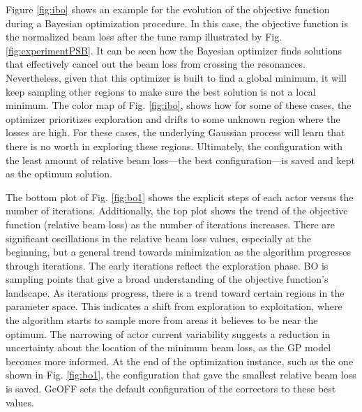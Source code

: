 Figure \ref{fig:ibo} shows an example for the evolution of the objective function during a Bayesian optimization procedure. In this case, the objective function is the normalized beam loss after the tune ramp illustrated by Fig. \ref{fig:experimentPSB}. It can be seen how the Bayesian optimizer finds solutions that effectively cancel out the beam loss from crossing the resonances. Nevertheless, given that this optimizer is built to find a global minimum, it will keep sampling other regions to make sure the best solution is not a local minimum. The color map of Fig. \ref{fig:ibo}, shows how for some of these cases, the optimizer prioritizes exploration and drifts to some unknown region where the losses are high. For these cases, the underlying Gaussian process will learn that there is no worth in exploring these regions. Ultimately, the configuration with the least amount of relative beam loss---the best configuration---is saved and kept as the optimum solution.

The bottom plot of Fig. \ref{fig:bo1} shows the explicit steps of each actor versus the number of iterations. Additionally, the top plot shows the trend of the objective function (relative beam loss) as the number of iterations increases. There are significant oscillations in the relative beam loss values, especially at the beginning, but a general trend towards minimization as the algorithm progresses through iterations. The early iterations reflect the exploration phase. BO is sampling points that give a broad understanding of the objective function's landscape. As iterations progress, there is a trend toward certain regions in the parameter space. This indicates a shift from exploration to exploitation, where the algorithm starts to sample more from areas it believes to be near the optimum. The narrowing of actor current variability suggests a reduction in uncertainty about the location of the minimum beam loss, as the GP model becomes more informed. At the end of the optimization instance, such as the one shown in Fig. \ref{fig:bo1}, the configuration that gave the smallest relative beam loss is saved. GeOFF sets the default configuration of the correctors to these best values. 

